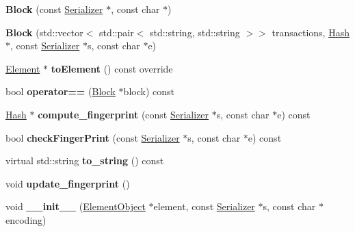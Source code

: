 \begin{DoxyCompactItemize}
\item 
\mbox{\label{classBlock_a02178e246d2e99fcdc58f8401776387a}} 
{\bfseries Block} (const \mbox{\hyperlink{classSerializer}{Serializer}} $\ast$, const char $\ast$)
\item 
\mbox{\label{classBlock_a52b897f6b8fbaccc0d18aa5fe677af9f}} 
{\bfseries Block} (std\+::vector$<$ std\+::pair$<$ std\+::string, std\+::string $>$$>$ transactions, \mbox{\hyperlink{classHash}{Hash}} $\ast$, const \mbox{\hyperlink{classSerializer}{Serializer}} $\ast$s, const char $\ast$e)
\item 
\mbox{\label{classBlock_aa289363a40f0d3ba88720ad0bc71f34f}} 
\mbox{\hyperlink{classElement}{Element}} $\ast$ {\bfseries to\+Element} () const override
\item 
\mbox{\label{classBlock_a24fef11a9eaf9b23490a734be5e30f30}} 
bool {\bfseries operator==} (\mbox{\hyperlink{classBlock}{Block}} $\ast$block) const
\item 
\mbox{\label{classBlock_ab9d7e32509fb1ab4ca2bb63854f52cc3}} 
\mbox{\hyperlink{classHash}{Hash}} $\ast$ {\bfseries compute\+\_\+fingerprint} (const \mbox{\hyperlink{classSerializer}{Serializer}} $\ast$s, const char $\ast$e) const
\item 
\mbox{\label{classBlock_a0755737dbbca68ee6a1ca62340843746}} 
bool {\bfseries check\+Finger\+Print} (const \mbox{\hyperlink{classSerializer}{Serializer}} $\ast$s, const char $\ast$e) const
\item 
\mbox{\label{classBlock_a1c8ebc79bd2ad82d138ee8159899baf6}} 
virtual std\+::string {\bfseries to\+\_\+string} () const
\item 
\mbox{\label{classBlock_afb50015ba1d705fc5ef5e12bb1cd1a56}} 
void {\bfseries update\+\_\+fingerprint} ()
\item 
\mbox{\label{classComponent_a28212595f8ee85fe009bd233bc99b2fc}} 
void {\bfseries \+\_\+\+\_\+init\+\_\+\+\_\+} (\mbox{\hyperlink{classElementObject}{Element\+Object}} $\ast$element, const \mbox{\hyperlink{classSerializer}{Serializer}} $\ast$s, const char $\ast$encoding)
\end{DoxyCompactItemize}
